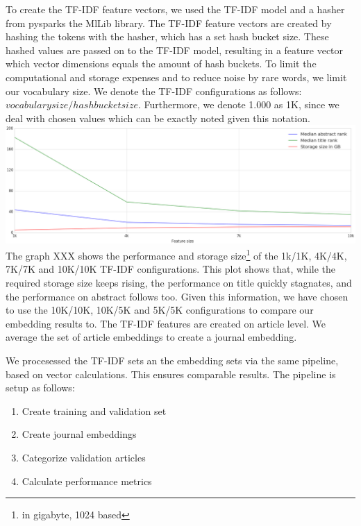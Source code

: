 \documentclass[../../Thesis.tex]{subfiles}
\begin{document}
To create the TF-IDF feature vectors, we used the TF-IDF model and a hasher from pysparks the MlLib library. The TF-IDF feature vectors are created by hashing the tokens with the hasher, which has a set hash bucket size. These hashed values are passed on to the TF-IDF model, resulting in a feature vector which vector dimensions equals the amount of hash buckets. To limit the computational and storage expenses and to reduce noise by rare words, we limit our vocabulary size.
We denote the TF-IDF configurations as follows: $vocabulary size/hashbucket size$. Furthermore, we denote 1.000 as 1K, since we deal with chosen values which can be exactly noted given this notation.\\
\includegraphics[width=6in]{Plots/tfidf_selection_plot}\\
The graph XXX shows the performance and storage size\footnote{in gigabyte, 1024 based} of the 1k/1K, 4K/4K, 7K/7K and 10K/10K TF-IDF configurations. This plot shows that, while the required storage size keeps rising, the performance on title quickly stagnates, and the performance on abstract follows too. Given this information, we have chosen to use the 10K/10K, 10K/5K and 5K/5K configurations to compare our embedding results to. The TF-IDF features are created on article level. We average the set of article embeddings to create a journal embedding. 

We procesessed the TF-IDF sets an the embedding sets via the same pipeline, based on vector calculations. This ensures comparable results. The pipeline is setup as follows:
\begin{enumerate}
\item{Create training and validation set}
\item{Create journal embeddings}
\item{Categorize validation articles}
\item{Calculate performance metrics}
\end{enumerate}
  
\end{document}
